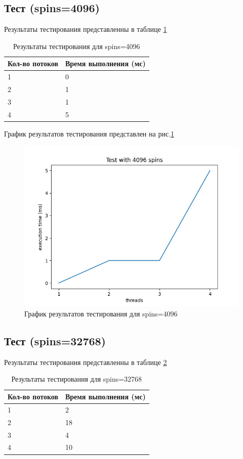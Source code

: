 \subsection*{Тест (spins=4096)}

Результаты тестирования представленны в таблице \ref{tab:results4096}


\begin{table}[H]
    \centering
    \begin{tabular}{|l|l|}
        \hline
        Кол-во потоков & Время выполнения (мс) \\
        \hline
        1 & 0 \\
        \hline
        2 & 1 \\
        \hline
        3 & 1 \\
        \hline
        4 & 5 \\
        \hline
    \end{tabular}
    \caption{Результаты тестирования для spins=4096}
    \label{tab:results4096}
\end{table}
        

График результатов тестирования представлен на рис.\ref{fig:plot4096}

\begin{figure}[H]
    \centering
    \includegraphics[width=0.7\linewidth]{photo/plot4096}
    \caption{График результатов тестирования для spins=4096}
    \label{fig:plot4096}
\end{figure}

\subsection*{Тест (spins=32768)}

Результаты тестирования представленны в таблице \ref{tab:results32768}


\begin{table}[H]
    \centering
    \begin{tabular}{|l|l|}
        \hline
        Кол-во потоков & Время выполнения (мс) \\
        \hline
        1 & 2 \\
        \hline
        2 & 18 \\
        \hline
        3 & 4 \\
        \hline
        4 & 10 \\
        \hline
    \end{tabular}
    \caption{Результаты тестирования для spins=32768}
    \label{tab:results32768}
\end{table}
        

